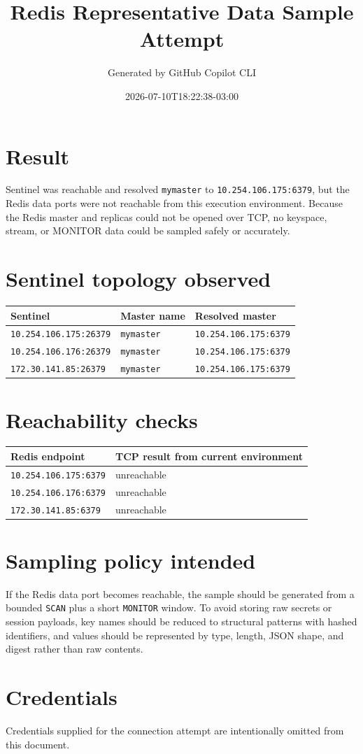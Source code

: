\documentclass{article}
\title{Redis Representative Data Sample Attempt}
\author{Generated by GitHub Copilot CLI}
\date{2026-07-10T18:22:38-03:00}
\begin{document}
\maketitle

\section*{Result}
Sentinel was reachable and resolved \texttt{mymaster} to \texttt{10.254.106.175:6379}, but the Redis data ports were not reachable from this execution environment. Because the Redis master and replicas could not be opened over TCP, no keyspace, stream, or MONITOR data could be sampled safely or accurately.

\section*{Sentinel topology observed}
\begin{longtable}{lll}
\toprule
Sentinel & Master name & Resolved master\\
\midrule
\texttt{10.254.106.175:26379} & \texttt{mymaster} & \texttt{10.254.106.175:6379}\\
\texttt{10.254.106.176:26379} & \texttt{mymaster} & \texttt{10.254.106.175:6379}\\
\texttt{172.30.141.85:26379} & \texttt{mymaster} & \texttt{10.254.106.175:6379}\\
\bottomrule
\end{longtable}

\section*{Reachability checks}
\begin{longtable}{ll}
\toprule
Redis endpoint & TCP result from current environment\\
\midrule
\texttt{10.254.106.175:6379} & unreachable\\
\texttt{10.254.106.176:6379} & unreachable\\
\texttt{172.30.141.85:6379} & unreachable\\
\bottomrule
\end{longtable}

\section*{Sampling policy intended}
If the Redis data port becomes reachable, the sample should be generated from a bounded \texttt{SCAN} plus a short \texttt{MONITOR} window. To avoid storing raw secrets or session payloads, key names should be reduced to structural patterns with hashed identifiers, and values should be represented by type, length, JSON shape, and digest rather than raw contents.

\section*{Credentials}
Credentials supplied for the connection attempt are intentionally omitted from this document.
\end{document}

